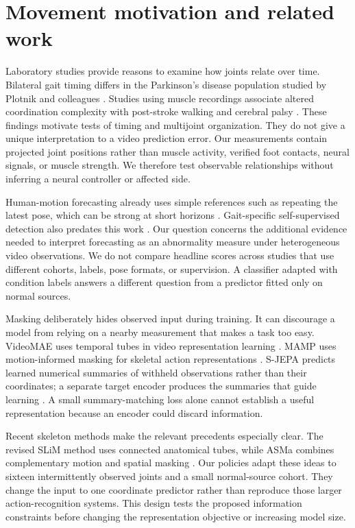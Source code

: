 \documentclass[letterpaper]{article}
\begin{document}
\section{Movement motivation and related work}

Laboratory studies provide reasons to examine how joints relate over time. Bilateral gait timing differs in the Parkinson's disease population studied by Plotnik and colleagues \citep{plotnik2007}. Studies using muscle recordings associate altered coordination complexity with post-stroke walking and cerebral palsy \citep{clark2010,steele2015}. These findings motivate tests of timing and multijoint organization. They do not give a unique interpretation to a video prediction error. Our measurements contain projected joint positions rather than muscle activity, verified foot contacts, neural signals, or muscle strength. We therefore test observable relationships without inferring a neural controller or affected side.

Human-motion forecasting already uses simple references such as repeating the latest pose, which can be strong at short horizons \citep{martinez2017}. Gait-specific self-supervised detection also predates this work \citep{duan2024}. Our question concerns the additional evidence needed to interpret forecasting as an abnormality measure under heterogeneous video observations. We do not compare headline scores across studies that use different cohorts, labels, pose formats, or supervision. A classifier adapted with condition labels answers a different question from a predictor fitted only on normal sources.

Masking deliberately hides observed input during training. It can discourage a model from relying on a nearby measurement that makes a task too easy. VideoMAE uses temporal tubes in video representation learning \citep{tong2022}. MAMP uses motion-informed masking for skeletal action representations \citep{mao2023}. S-JEPA predicts learned numerical summaries of withheld observations rather than their coordinates; a separate target encoder produces the summaries that guide learning \citep{abdelfattah2024}. A small summary-matching loss alone cannot establish a useful representation because an encoder could discard information.

Recent skeleton methods make the relevant precedents especially clear. The revised SLiM method uses connected anatomical tubes, while ASMa combines complementary motion and spatial masking \citep{do2026,anand2026}. Our policies adapt these ideas to sixteen intermittently observed joints and a small normal-source cohort. They change the input to one coordinate predictor rather than reproduce those larger action-recognition systems. This design tests the proposed information constraints before changing the representation objective or increasing model size.
\end{document}
